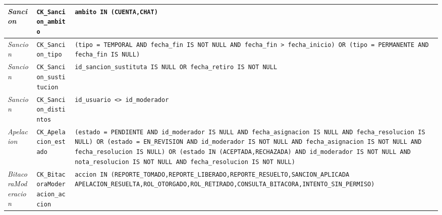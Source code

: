 \begin{center}
\begin{longtable}{|L{0.19\textwidth}|L{0.23\textwidth}|L{0.48\textwidth}|}
\textit{Sancion} & \texttt{CK\_\allowbreak{}Sancion\_\allowbreak{}ambito} & \texttt{ambito IN (\textquotesingle{}CUENTA\textquotesingle{},\allowbreak{}\textquotesingle{}CHAT\textquotesingle{})} \\ \hline
\textit{Sancion} & \texttt{CK\_\allowbreak{}Sancion\_\allowbreak{}tipo} & \texttt{(tipo = \textquotesingle{}TEMPORAL\textquotesingle{} AND fecha\_\allowbreak{}fin IS NOT NULL AND fecha\_\allowbreak{}fin > fecha\_\allowbreak{}inicio) OR (tipo = \textquotesingle{}PERMANENTE\textquotesingle{} AND fecha\_\allowbreak{}fin IS NULL)} \\ \hline
\textit{Sancion} & \texttt{CK\_\allowbreak{}Sancion\_\allowbreak{}sustitucion} & \texttt{id\_\allowbreak{}sancion\_\allowbreak{}sustituta IS NULL OR fecha\_\allowbreak{}retiro IS NOT NULL} \\ \hline
\textit{Sancion} & \texttt{CK\_\allowbreak{}Sancion\_\allowbreak{}distintos} & \texttt{id\_\allowbreak{}usuario <> id\_\allowbreak{}moderador} \\ \hline
\textit{Apelacion} & \texttt{CK\_\allowbreak{}Apelacion\_\allowbreak{}estado} & \texttt{(estado = \textquotesingle{}PENDIENTE\textquotesingle{} AND id\_\allowbreak{}moderador IS NULL AND fecha\_\allowbreak{}asignacion IS NULL AND fecha\_\allowbreak{}resolucion IS NULL) OR (estado = \textquotesingle{}EN\_\allowbreak{}REVISION\textquotesingle{} AND id\_\allowbreak{}moderador IS NOT NULL AND fecha\_\allowbreak{}asignacion IS NOT NULL AND fecha\_\allowbreak{}resolucion IS NULL) OR (estado IN (\textquotesingle{}ACEPTADA\textquotesingle{},\allowbreak{}\textquotesingle{}RECHAZADA\textquotesingle{}) AND id\_\allowbreak{}moderador IS NOT NULL AND nota\_\allowbreak{}resolucion IS NOT NULL AND fecha\_\allowbreak{}resolucion IS NOT NULL)} \\ \hline
\textit{Bitacora\-Moderacion} & \texttt{CK\_\allowbreak{}Bitacora\allowbreak{}Moderacion\_\allowbreak{}accion} & \texttt{accion IN (\textquotesingle{}REPORTE\_\allowbreak{}TOMADO\textquotesingle{},\allowbreak{}\textquotesingle{}REPORTE\_\allowbreak{}LIBERADO\textquotesingle{},\allowbreak{}\textquotesingle{}REPORTE\_\allowbreak{}RESUELTO\textquotesingle{},\allowbreak{}\textquotesingle{}SANCION\_\allowbreak{}APLICADA\textquotesingle{} \textquotesingle{}APELACION\_\allowbreak{}RESUELTA\textquotesingle{},\allowbreak{}\textquotesingle{}ROL\_\allowbreak{}OTORGADO\textquotesingle{},\allowbreak{}\textquotesingle{}ROL\_\allowbreak{}RETIRADO\textquotesingle{},\allowbreak{}\textquotesingle{}CONSULTA\_\allowbreak{}BITACORA\textquotesingle{},\allowbreak{}\textquotesingle{}INTENTO\_\allowbreak{}SIN\_\allowbreak{}PERMISO\textquotesingle{})} \\ \hline

\end{longtable}
\end{center}
